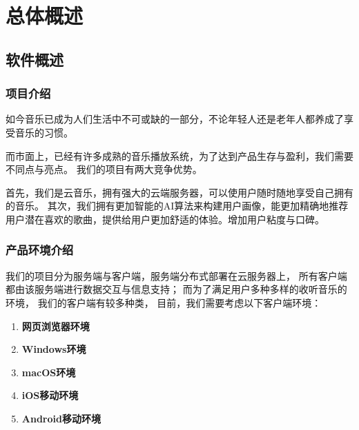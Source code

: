 
\chapter{总体概述}

\section{软件概述}
\subsection{项目介绍}

如今音乐已成为人们生活中不可或缺的一部分，不论年轻人还是老年人都养成了享受音乐的习惯。

而市面上，已经有许多成熟的音乐播放系统，为了达到产品生存与盈利，我们需要不同点与亮点。
我们的\proname 项目有两大竞争优势。

首先，我们是云音乐，拥有强大的云端服务器，可以使用户随时随地享受自己拥有的音乐。
其次，我们拥有更加智能的AI算法来构建用户画像，能更加精确地推荐用户潜在喜欢的歌曲，提供给用户更加舒适的体验。增加用户粘度与口碑。

\subsection{产品环境介绍}

我们的项目分为服务端与客户端，服务端分布式部署在云服务器上，
    所有客户端都由该服务端进行数据交互与信息支持；
    而为了满足用户多种多样的收听音乐的环境，
    我们的客户端有较多种类，
    目前，我们需要考虑以下客户端环境：
    \begin{enumerate}
        \item \textbf{网页浏览器环境}
        \item \textbf{Windows环境}
        \item \textbf{macOS环境}
        \item \textbf{iOS移动环境}
        \item \textbf{Android移动环境}
    \end{enumerate}

